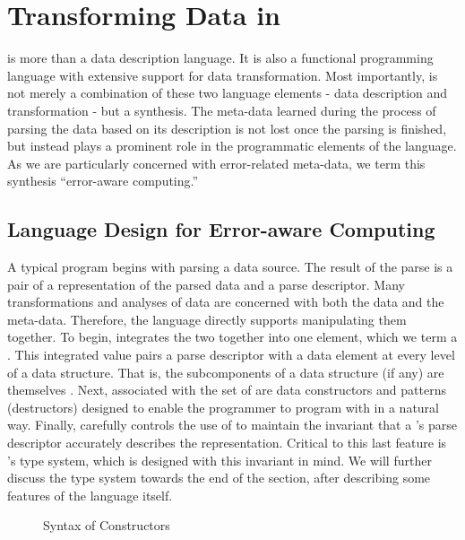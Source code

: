 \section{Transforming Data in \datatype{}}
\label{sec:data-transformation}

\datatype{} is more than a data description language. It is also a
functional programming language with extensive support for data
transformation. Most importantly, \datatype{} is not merely a
combination of these two language elements - data description and
transformation - but a synthesis.  The meta-data learned during the
process of parsing the data based on its description is not lost once
the parsing is finished, but instead plays a prominent role in the
programmatic elements of the language. As we are particularly
concerned with error-related meta-data, we term this synthesis
``error-aware computing.''

\subsection{Language Design for Error-aware Computing}

A typical \datatype{} program begins with parsing a data source. The
result of the parse is a pair of a representation of the parsed data
and a parse descriptor. Many transformations and analyses of data are
concerned with both the data and the meta-data. Therefore, the
language directly supports manipulating them together. To begin,
\datatype{} integrates the two together into one element, which we
term a \pvalue{}. This integrated value pairs a parse descriptor with
a data element at every level of a data structure. That is, the
subcomponents of a data structure (if any) are themselves \pvalue{}.
Next, associated with the set of \pvalue{} are data constructors and
patterns (destructors) designed to enable the programmer to program
with \pvalue{} in a natural way.  Finally, \datatype{} carefully
controls the use of \pvalue{} to maintain the invariant that a
\pvalue{}'s parse descriptor accurately describes the representation.
Critical to this last feature is \datatype{}'s type system, which is
designed with this invariant in mind. We will further discuss the type
system towards the end of the section, after describing some features
of the language itself.

\begin{figure}
  \centering
  
  \caption{Syntax of Constructors}
  \label{fig:syntax-terms}
\end{figure}

